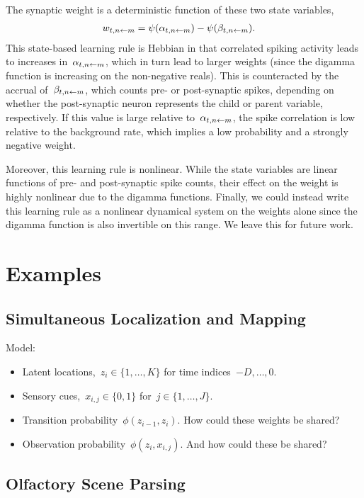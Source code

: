 The synaptic weight is a deterministic function of these two state variables,
\begin{align}
  w_{t, n \leftarrow m} &= \psi(\alpha_{t, n \leftarrow m}) - \psi(\beta_{t, n \leftarrow m}).
\end{align}
This state-based learning rule is Hebbian in that correlated spiking
activity leads to increases in~$\alpha_{t,n\leftarrow m}$, which in turn
lead to larger weights (since the digamma function is increasing on
the non-negative reals).
This is counteracted by the accrual of~$\beta_{t, n \leftarrow m}$, which
counts pre- or post-synaptic spikes, depending on whether the
post-synaptic neuron represents the child or parent variable, respectively.
If this value is large relative to~$\alpha_{t, n \leftarrow m}$, the
spike correlation is low relative to the background rate, which
implies a low probability and a strongly negative weight. 

Moreover, this learning rule is nonlinear. While the state variables
are linear functions of pre- and post-synaptic spike counts, their
effect on the weight is highly nonlinear due to the digamma functions.
Finally, we could instead write this learning rule as a nonlinear
dynamical system on the weights alone since the digamma function is
also invertible on this range. We leave this for future work.

\section{Examples}


\subsection{Simultaneous Localization and Mapping}

Model:
\begin{itemize}
\item Latent locations,~$z_i \in \{1, \ldots, K\}$ for time indices~$-D, \ldots, 0$.
\item Sensory cues,~$x_{i,j} \in \{0,1\}$ for~$j \in \{1, \ldots, J\}$.
\item Transition probability~$\phi(z_{i-1}, z_i)$. How could these weights be shared?
\item Observation probability~$\phi(z_{i}, x_{i,j})$. And how could these be shared?
\end{itemize}

\subsection{Olfactory Scene Parsing}


